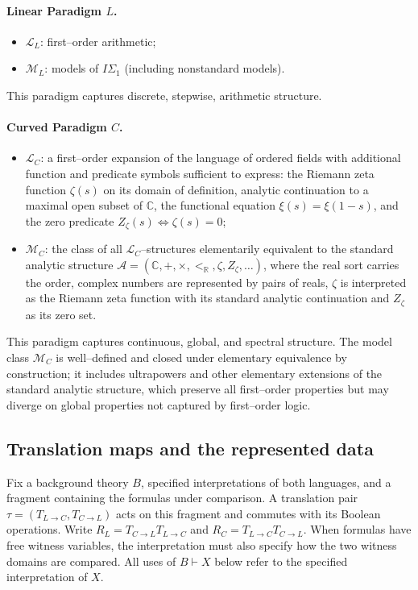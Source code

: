 \documentclass{article}
\theoremstyle{definition}
\begin{document}
\paragraph{Linear Paradigm $L$.}
\begin{itemize}
\item $\mathcal{L}_L$: first--order arithmetic;
\item $\mathcal{M}_L$: models of $I\Sigma_1$ (including nonstandard models).
\end{itemize}
This paradigm captures discrete, stepwise, arithmetic structure.
\paragraph{Curved Paradigm $C$.}
\begin{itemize}
\item $\mathcal{L}_C$: a first--order expansion of the language of 
      ordered fields with additional function and predicate symbols 
      sufficient to express: the Riemann zeta function $\zeta(s)$ on 
      its domain of definition, analytic continuation to a maximal 
      open subset of $\mathbb{C}$, the functional equation 
      $\xi(s) = \xi(1-s)$, and the zero predicate 
      $Z_\zeta(s) \iff \zeta(s) = 0$;
\item $\mathcal{M}_C$: the class of all $\mathcal{L}_C$--structures 
      elementarily equivalent to the standard analytic structure 
      $\mathcal{A} = (\mathbb{C}, +, \times, <_{\mathbb R}, \zeta, Z_\zeta, 
      \ldots)$, where the real sort carries the order, complex numbers are represented by pairs of reals, $\zeta$ is interpreted as the Riemann zeta 
      function with its standard analytic continuation and 
      $Z_\zeta$ as its zero set.
\end{itemize}
This paradigm captures continuous, global, and spectral structure. 
The model class $\mathcal{M}_C$ is well--defined and closed under 
elementary equivalence by construction; it includes ultrapowers and 
other elementary extensions of the standard analytic structure, which 
preserve all first--order properties but may diverge on global 
properties not captured by first--order logic.

\subsection{Translation maps and the represented data}
Fix a background theory $B$, specified interpretations of both languages,
and a fragment containing the formulas under comparison. A translation pair
$\tau=(T_{L\to C},T_{C\to L})$ acts on this fragment and commutes with its
Boolean operations. Write $R_L=T_{C\to L}T_{L\to C}$ and
$R_C=T_{L\to C}T_{C\to L}$. When formulas have free witness variables,
the interpretation must also specify how the two witness domains are compared.
All uses of $B\vdash X$ below refer to the specified interpretation of $X$.
\end{document}
